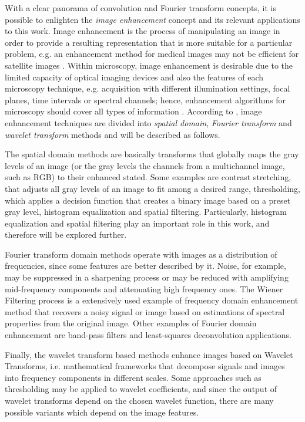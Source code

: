 With a clear panorama of convolution and Fourier transform concepts, it is possible to enlighten the \emph{image enhancement} concept and its relevant applications to this work. Image enhancement is the process of manipulating an image in order to provide a resulting representation that is more suitable for a particular problem, e.g. an enhancement method for medical images may not be efficient for satellite images \cite{gonzalez2018digital}. Within microscopy, image enhancement is desirable due to the limited capacity of optical imaging devices and also the features of each microscopy technique, e.g. acquisition with different illumination settings, focal planes, time intervals or spectral channels; hence, enhancement algorithms for microscopy should cover all types of information \cite{wu2008microscope}. According to , image enhancement techniques are divided into \emph{spatial domain}, \emph{Fourier transform} and \emph{wavelet transform} methods and will be described as follows. 

The spatial domain methods are basically transforms that globally maps the gray levels of an image (or the gray levels the channels from a multichannel image, such as RGB) to their enhanced stated. Some examples are contrast stretching, that adjusts all gray levels of an image to fit among a desired range, thresholding, which applies a decision function that creates a binary image based on a preset gray level, histogram equalization and spatial filtering. Particularly, histogram equalization and spatial filtering play an important role in this work, and therefore will be explored further.

Fourier transform domain methods operate with images as a distribution of frequencies, since some features are better described by it. Noise, for example, may be suppressed in a sharpening process or may be reduced with amplifying mid-frequency components and attenuating high frequency ones. The Wiener Filtering process is a extensively used example of frequency domain enhancement method that recovers a noisy signal or image based on estimations of spectral properties from the original image. Other examples of Fourier domain enhancement are band-pass filters and least-squares deconvolution applications.

Finally, the wavelet transform based methods enhance images based on Wavelet Transforms, i.e. mathematical frameworks that decompose signals and images into frequency components in different scales. Some approaches such as thresholding may be applied to wavelet coefficients, and since the output of wavelet transforms depend on the chosen wavelet function, there are many possible variants which depend on the image features. 

